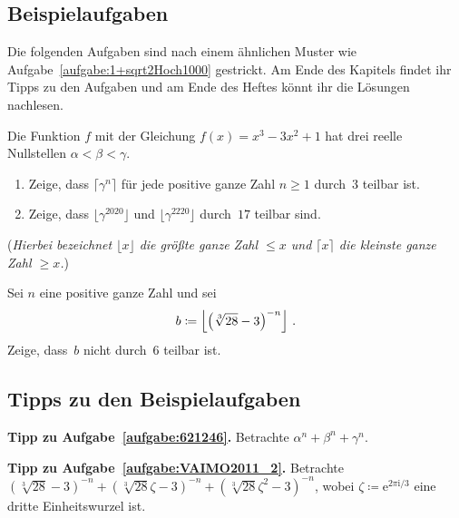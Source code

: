 \subsection*{Beispielaufgaben}

Die folgenden Aufgaben sind nach einem ähnlichen Muster wie Aufgabe~\ref{aufgabe:1+sqrt2Hoch1000} gestrickt. Am Ende des Kapitels findet ihr Tipps zu den Aufgaben und am Ende des Heftes könnt ihr die Lösungen nachlesen.

\begin{aufgabe*}\label{aufgabe:621246}
	Die Funktion $f$ mit der Gleichung $f(x)=x^3-3x^2+1$ hat drei reelle Nullstellen $\alpha<\beta<\gamma$.
	\begin{enumerate}[label={$(\alph*)$},ref={$(\alph*)$}]
		\item Zeige, dass $\lceil\gamma^n\rceil$ für jede positive ganze Zahl $n\geqslant 1$ durch~$3$ teilbar ist.\label{teilaufgabe:621246}
		\item Zeige, dass $\lfloor \gamma^{2020}\rfloor$ und $\lfloor \gamma^{2220}\rfloor$ durch~$17$ teilbar sind.\label{teilaufgabe:IMOSL1988}
	\end{enumerate}
	(\emph{Hierbei bezeichnet $\lfloor x\rfloor$ die größte ganze Zahl $\leqslant x$ und $\lceil x\rceil$ die kleinste ganze Zahl $\geqslant x$.}) 
\end{aufgabe*}
\begin{aufgabe*}\label{aufgabe:VAIMO2011_2}
	Sei $n$ eine positive ganze Zahl und sei
	\begin{equation*}
		b\coloneqq \left\lfloor \parens*{\sqrt[3]{28}-3}^{-n}\right\rfloor\,.
	\end{equation*}
	Zeige, dass~$b$ nicht durch~$6$ teilbar ist.
\end{aufgabe*}
\subsection*{Tipps zu den Beispielaufgaben}

\textbf{Tipp zu Aufgabe~\ref{aufgabe:621246}.} Betrachte $\alpha^n+\beta^n+\gamma^n$.

\textbf{Tipp zu Aufgabe~\ref{aufgabe:VAIMO2011_2}.} Betrachte $(\sqrt[3]{28}-3)^{-n}+(\sqrt[3]{28}\zeta-3)^{-n}+(\sqrt[3]{28}\zeta^2-3)^{-n}$, wobei $\zeta\coloneqq \mathrm{e}^{2\pi\mathrm{i}/3}$ eine dritte Einheitswurzel ist.
